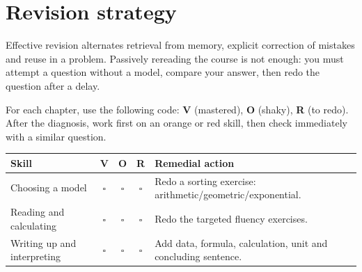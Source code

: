 
\section{Revision strategy}
\begin{keypoint}
Effective revision alternates retrieval from memory, explicit correction of mistakes and reuse in a problem. Passively rereading the course is not enough: you must attempt a question without a model, compare your answer, then redo the question after a delay.
\end{keypoint}

For each chapter, use the following code: \textbf{V} (mastered), \textbf{O} (shaky), \textbf{R} (to redo). After the diagnosis, work first on an orange or red skill, then check immediately with a similar question.

\begin{center}
\begin{tabularx}{.9\textwidth}{lcccX}
\toprule
Skill & V & O & R & Remedial action \\
\midrule
Choosing a model & $\square$ & $\square$ & $\square$ & Redo a sorting exercise: arithmetic/geometric/exponential.\\
Reading and calculating & $\square$ & $\square$ & $\square$ & Redo the targeted fluency exercises.\\
Writing up and interpreting & $\square$ & $\square$ & $\square$ & Add data, formula, calculation, unit and concluding sentence.\\
\bottomrule
\end{tabularx}
\end{center}

